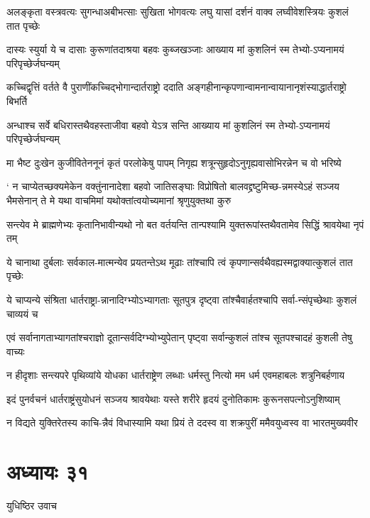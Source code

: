 \twolineshloka
{अलङ्कृता वस्त्रवत्यः सुगन्धाअबीभत्साः सुखिता भोगवत्यः}
{लघु यासां दर्शनं वाक्व लघ्वीवेशस्त्रियः कुशलं तात पृच्छेः}


\threelineshloka
{दास्यः स्युर्या ये च दासाः कुरूणांतदाश्रया बहवः कुब्जखञ्जाः}
{आख्याय मां कुशलिनं स्म तेभ्यो-ऽप्यनामयं परिपृच्छेर्जघन्यम्}
{}


\twolineshloka
{कच्चिद्वृत्तिं वर्तते वै पुराणींकच्चिद्भोगान्दार्तराष्ट्रो ददाति}
{अङ्गहीनान्कृपणान्वामनान्वायानानृशंस्याद्धार्तराष्ट्रो बिभर्ति}


\twolineshloka
{अन्धाश्च सर्वे बधिरास्तथैवहस्ताजीवा बहवो येऽत्र सन्ति}
{आख्याय मां कुशलिनं स्म तेभ्यो-ऽप्यनामयं परिपृच्छेर्जघन्यम्}


\twolineshloka
{मा भैष्ट दुःखेन कुजीवितेननूनं कृतं परलोकेषु पापम्}
{निगृह्य शत्रून्सुहृदोऽनुगृह्यवासोभिरन्नेन च वो भरिष्ये}


\threelineshloka
{` न चाप्येतच्छक्यमेकेन वक्तुंनानादेशा बहवो जातिसङ्घाः}
{विप्रोषितो बालवद्द्रष्टुमिच्छ-न्नमस्येऽहं सञ्जय भैमसेनान्}
{ते मे यथा वाचमिमां यथोक्तांत्वयोच्यमानां श्रृणुयुक्तथा कुरु}


\twolineshloka
{सन्त्येव मे ब्राह्मणेभ्यः कृतानिभावीन्यथो नो बत वर्तयन्ति}
{तान्पश्यामि युक्तरूपांस्तथैवतामेव सिद्धिं श्रावयेथा नृपं तम्}


\twolineshloka
{ये चानाथा दुर्बलाः सर्वकाल-मात्मन्येव प्रयतन्तेऽथ मूढाः}
{तांश्चापि त्वं कृपणान्सर्वथैवह्यस्मद्वाक्यात्कुशलं तात पृच्छेः}


\twolineshloka
{ये चाप्यन्ये संश्रिता धार्तराष्ट्रा-न्नानादिग्भ्योऽभ्यागताः सूतपुत्र}
{दृष्ट्वा तांश्चैवार्हतश्चापि सर्वा-न्संपृच्छेथाः कुशलं चाव्ययं च}


\twolineshloka
{एवं सर्वानागताभ्यागतांश्चराज्ञो दूतान्सर्वदिग्भ्योभ्युपेतान्}
{पृष्ट्वा सर्वान्कुशलं तांश्च सूतपश्चादहं कुशली तेषु वाच्यः}


\twolineshloka
{न हीदृशाः सन्त्यपरे पृथिव्यांये योधका धार्तराष्ट्रेण लब्धाः}
{धर्मस्तु नित्यो मम धर्म एवमहाबलः शत्रुनिबर्हणाय}


\twolineshloka
{इदं पुनर्वचनं धार्तराष्ट्रंसुयोधनं सञ्जय श्रावयेथाः}
{यस्ते शरीरे हृदयं दुनोतिकामः कुरूनसपत्नोऽनुशिष्याम्}


\twolineshloka
{न विद्यते युक्तिरेतस्य काचि-न्नैवं विधास्यामि यथा प्रियं ते}
{ददस्व वा शक्रपुरीं ममैवयुध्वस्व वा भारतमुख्यवीर}


\chapter{अध्यायः ३१}
\twolineshloka
{युधिष्ठिर उवाच}
{}


